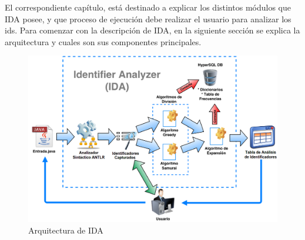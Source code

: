 El correspondiente capítulo, está destinado a explicar los distintos módulos que IDA posee, y que proceso de ejecución debe realizar el usuario para analizar los ids.
Para comenzar con la descripción de IDA, en la siguiente sección se explica la arquitectura y cuales son sus componentes principales.


%



\begin{figure}[t] %
\centerline{%
\includegraphics[scale= 0.35]{./cap4/ida_arq.png}
}
\caption{Arquitectura de IDA}
\label{arq_ida}
\end{figure}

